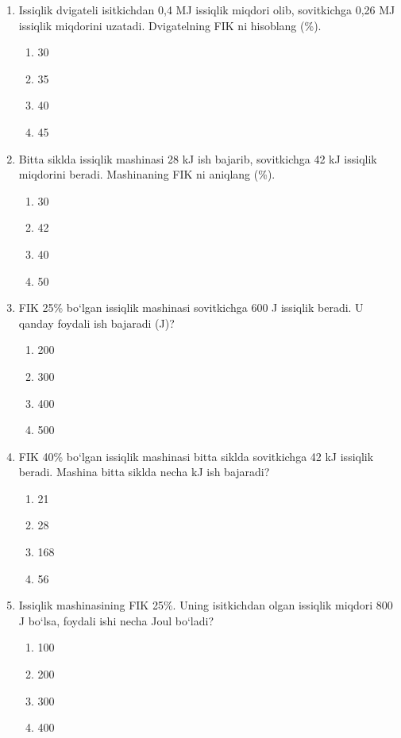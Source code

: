 \begin{enumerate}
\item Issiqlik dvigateli isitkichdan 0,4 MJ issiqlik miqdori olib, sovitkichga 0,26 MJ issiqlik miqdorini uzatadi. Dvigatelning FIK ni hisoblang (\%).
\begin{enumerate}[label=\Alph*)]
\item 30
\item 35
\item 40
\item 45
\end{enumerate}

\item Bitta siklda issiqlik mashinasi 28 kJ ish bajarib, sovitkichga 42 kJ issiqlik miqdorini beradi. Mashinaning FIK ni aniqlang (\%).
\begin{enumerate}[label=\Alph*)]
\item 30
\item 42
\item 40
\item 50
\end{enumerate}

\item FIK 25\% bo‘lgan issiqlik mashinasi sovitkichga 600 J issiqlik beradi. U qanday foydali ish bajaradi (J)?
\begin{enumerate}[label=\Alph*)]
\item 200
\item 300
\item 400
\item 500
\end{enumerate}

\item FIK 40\% bo‘lgan issiqlik mashinasi bitta siklda sovitkichga 42 kJ issiqlik beradi. Mashina bitta siklda necha kJ ish bajaradi?
\begin{enumerate}[label=\Alph*)]
\item 21
\item 28
\item 168
\item 56
\end{enumerate}

\item Issiqlik mashinasining FIK 25\%. Uning isitkichdan olgan issiqlik miqdori 800 J bo‘lsa, foydali ishi necha Joul bo‘ladi?
\begin{enumerate}[label=\Alph*)]
\item 100
\item 200
\item 300
\item 400
\end{enumerate}


\end{enumerate}

